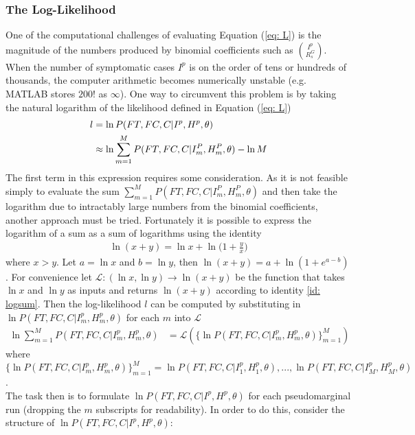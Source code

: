\subsubsection{The Log-Likelihood}
One of the computational challenges of evaluating Equation (\ref{eq: L}) is the magnitude of the numbers produced by binomial coefficients such as $\binom{I^p}{R_s^G}$. When the number of symptomatic cases $I^p$ is on the order of tens or hundreds of thousands, the computer arithmetic becomes numerically unstable (e.g. MATLAB stores $200!$ as $\infty$). One way to circumvent this problem is by taking the natural logarithm of the likelihood defined in Equation (\ref{eq: L})
\begin{align} \notag \label{eqn: log posterior as average}
	l &=\ln P(FT, FC, C | I^p, H^p, \theta)\\
	&\approx \ln \sum_{m=1}^{M} P(FT, FC, C| I_m^P, H_m^P, \theta) - \ln M
\end{align}
The first term in this expression requires some consideration. As it is not feasible simply to evaluate the sum $\sum_{m=1}^{M} P(FT, FC, C| I_m^P, H_m^P, \theta)$ and then take the logarithm due to intractably large numbers from the binomial coefficients, another approach must be tried. Fortunately it is possible to express the logarithm of a sum as a sum of logarithms using the identity
\begin{align} \label{id: logsum}
	\ln(x+y) = \ln x + \ln \bigg(1 + \frac{y}{x} \bigg)
\end{align}
where $x>y$. Let $a=\ln x$ and $b = \ln y$, then $\ln (x+y) = a + \ln (1 + e^{a-b})$. For convenience let $\mathcal{L}:(\ln x, \ln y) \rightarrow \ln(x+y)$ be the function that takes $\ln x$ and $\ln y$ as inputs and returns $\ln(x+y)$ according to identity \ref{id: logsum}. Then the log-likelihood $l$ can be computed by substituting in $\ln P(FT, FC, C| I_m^p, H_m^p, \theta)$ for each $m$ into $\mathcal{L}$
\begin{align}
	\ln \sum_{m=1}^{M} P(FT, FC, C| I_m^p, H_m^p, \theta) &= \mathcal{L}(\{\ln P(FT, FC, C| I_m^p, H_m^p, \theta)\}_{m=1}^{M})
\end{align}
where \\
$\{\ln P(FT, FC, C| I_m^p, H_m^p, \theta)\}_{m=1}^{M} = \ln P(FT, FC, C| I_1^p, H_1^p, \theta),..., \ln P(FT, FC, C| I_M^p, H_M^p, \theta)$.\\
The task then is to formulate $\ln P(FT, FC, C| I^p, H^p, \theta)$ for each pseudomarginal run (dropping the $m$ subscripts for readability). In order to do this, consider the structure of $\ln P(FT, FC, C| I^p, H^p, \theta)$:
